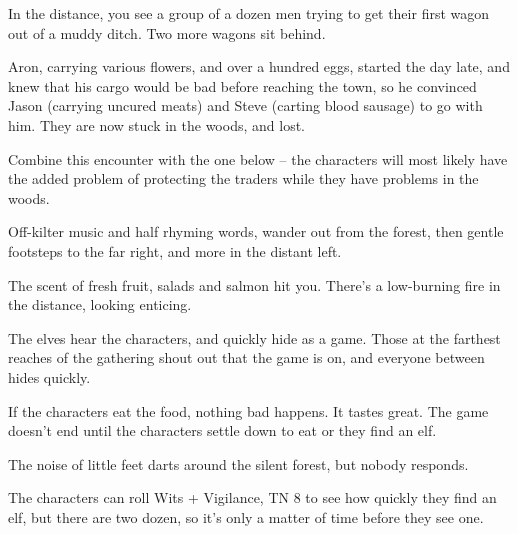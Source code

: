 \begin{multicols}{2}
\begin{rollchart}
\end{rollchart}


\begin{boxtext}
	In the distance, you see a group of a dozen men trying to get their first wagon out of a muddy ditch.  Two more wagons sit behind.
\end{boxtext}

Aron, carrying various flowers, and over a hundred eggs, started the day late, and knew that his cargo would be bad before reaching the town, so he convinced Jason (carrying uncured meats) and Steve (carting blood sausage) to go with him.  They are now stuck in the woods, and lost.

Combine this encounter with the one below -- the characters will most likely have the added problem of protecting the traders while they have problems in the woods.


\humantrader


\begin{boxtext}

	Off-kilter music and half rhyming words, wander out from the forest, then gentle footsteps to the far right, and more in the distant left.

	The scent of fresh fruit, salads and salmon hit you.  There's a low-burning fire in the distance, looking enticing.

\end{boxtext}

The elves hear the characters, and quickly hide as a game.  Those at the farthest reaches of the gathering shout out that the game is on, and everyone between hides quickly.

If the characters eat the food, nothing bad happens.  It tastes great.  The game doesn't end until the characters settle down to eat or they find an elf.

\begin{boxtext}

	The noise of little feet darts around the silent forest, but nobody responds.

\end{boxtext}

The characters can roll Wits + Vigilance, TN 8 to see how quickly they find an elf, but there are two dozen, so it's only a matter of time before they see one.


\end{multicols}
